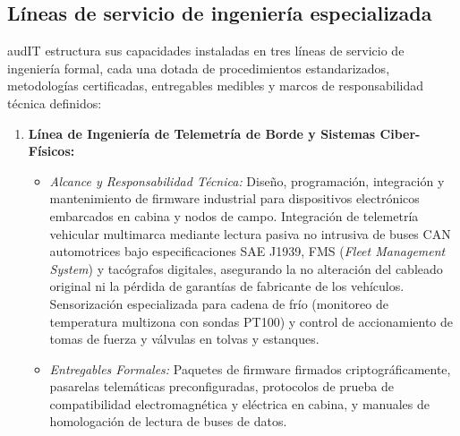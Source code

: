 \subsection{Líneas de servicio de ingeniería especializada}\label{sec:1-lineas-servicio}

audIT estructura sus capacidades instaladas en tres líneas de servicio de ingeniería formal, cada una dotada de procedimientos estandarizados, metodologías certificadas, entregables medibles y marcos de responsabilidad técnica definidos:

\begin{enumerate}
  \item \textbf{Línea de Ingeniería de Telemetría de Borde y Sistemas Ciber-Físicos:}
  \begin{itemize}
    \item \textit{Alcance y Responsabilidad Técnica:} Diseño, programación, integración y mantenimiento de firmware industrial para dispositivos electrónicos embarcados en cabina y nodos de campo. Integración de telemetría vehicular multimarca mediante lectura pasiva no intrusiva de buses CAN automotrices bajo especificaciones SAE J1939, FMS (\textit{Fleet Management System}) y tacógrafos digitales, asegurando la no alteración del cableado original ni la pérdida de garantías de fabricante de los vehículos. Sensorización especializada para cadena de frío (monitoreo de temperatura multizona con sondas PT100) y control de accionamiento de tomas de fuerza y válvulas en tolvas y estanques.
    \item \textit{Entregables Formales:} Paquetes de firmware firmados criptográficamente, pasarelas telemáticas preconfiguradas, protocolos de prueba de compatibilidad electromagnética y eléctrica en cabina, y manuales de homologación de lectura de buses de datos.
  \end{itemize}


\end{enumerate}
